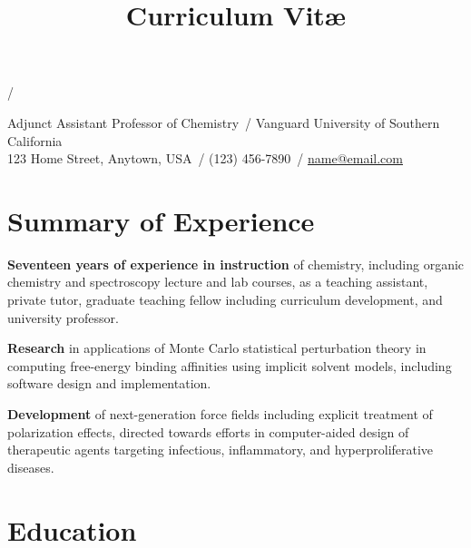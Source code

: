 \documentclass[10pt]{article}
\author{\myname}
\title{Curriculum Vit\ae}
\makeatletter
\def\mycolor{Red}%
\def\position{Adjunct Assistant Professor of Chemistry}
\def\currempl{Vanguard University of Southern California}
\def\address{55 Fair Drive, Costa Mesa, California 92626}
\def\dept{School of Natural Sciences and Mathematics}
\renewcommand{\maketitle}{
				{\huge{\color{\mycolor}\textbf{\theauthor}} / \hspace{-0.5mm}\thetitle}

				\position\ / \dept \\
				\currempl\ / \address

				\vspace*{0pt}
				}
\def\address{123 Home Street, Anytown, USA}
\def\phone{(123) 456-7890}
\def\mymail{\email{name@email.com}}
\renewcommand{\maketitle}{
				{\huge{\color{\mycolor}\textbf{\theauthor}} / \hspace{-0.5mm}\thetitle}

				\position\ / \currempl \\
				\address\ / \phone\ / \mymail 

				\vspace*{0pt}
				}
\newcommand*\email[1]{\href{mailto:#1}{#1}}
\newcommand*\paritem[2]{\textbf{#1} #2}
\makeatother
\begin{document}

\maketitle


\section{Summary of Experience}


\paritem{Seventeen years of experience in instruction} {of chemistry, including organic chemistry and spectroscopy lecture and lab courses, as a teaching assistant, private tutor, graduate teaching fellow including curriculum development, and university professor.}

\paritem{Research} {in applications of Monte Carlo statistical perturbation theory in computing free-energy binding affinities using implicit solvent models, including software design and implementation.} 

\paritem{Development} {of next-generation force fields including explicit treatment of polarization effects, directed towards efforts in computer-aided design of therapeutic agents targeting infectious, inflammatory, and hyperproliferative diseases.}


\section{Education}
\end{document}
